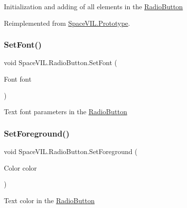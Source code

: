 Initialization and adding of all elements in the \mbox{\hyperlink{class_space_v_i_l_1_1_radio_button}{Radio\+Button}} 



Reimplemented from \mbox{\hyperlink{class_space_v_i_l_1_1_prototype_ac3379fe02923ee155b5b0084abf27420}{Space\+V\+I\+L.\+Prototype}}.

\mbox{\label{class_space_v_i_l_1_1_radio_button_a58468eb198714c58266c4a88cb856ebe}} 
\subsubsection{\texorpdfstring{Set\+Font()}{SetFont()}}
{\footnotesize\ttfamily void Space\+V\+I\+L.\+Radio\+Button.\+Set\+Font (\begin{DoxyParamCaption}\item[{Font}]{font }\end{DoxyParamCaption})}



Text font parameters in the \mbox{\hyperlink{class_space_v_i_l_1_1_radio_button}{Radio\+Button}} 

\mbox{\label{class_space_v_i_l_1_1_radio_button_a473085ed46d316aab157cd78d495f053}} 
\subsubsection{\texorpdfstring{Set\+Foreground()}{SetForeground()}}
{\footnotesize\ttfamily void Space\+V\+I\+L.\+Radio\+Button.\+Set\+Foreground (\begin{DoxyParamCaption}\item[{Color}]{color }\end{DoxyParamCaption})}



Text color in the \mbox{\hyperlink{class_space_v_i_l_1_1_radio_button}{Radio\+Button}} 

\mbox{\label{class_space_v_i_l_1_1_radio_button_a5f7fdd3aa50cb94b6ee28e364a058acb}} 
